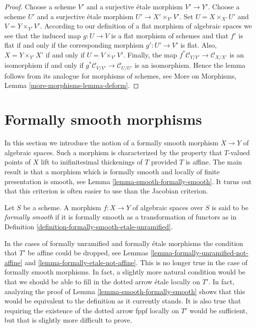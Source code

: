 \begin{proof}
Choose a scheme $V'$ and a surjective \'etale morphism $V' \to Y'$.
Choose a scheme $U'$ and a surjective \'etale morphism
$U' \to X' \times_{Y'} V'$. Set $U = X \times_{X'} U'$ and
$V = Y \times_{Y'} V'$. According to our definition of a flat morphism
of algebraic spaces we see that the induced map $g : U \to V$ is a flat
morphism of schemes and that $f'$ is flat if and only if the corresponding
morphism $g' : U' \to V'$ is flat. Also, $X = Y \times_{Y'} X'$ if and only
if $U = V \times_{V'} V'$. Finally, the map
$f^*\mathcal{C}_{Y/Y'} \to \mathcal{C}_{X/X'}$
is an isomorphism if and only if
$g^*\mathcal{C}_{V/V'} \to \mathcal{C}_{U/U'}$ is an isomorphism.
Hence the lemma follows from its analogue for morphisms of schemes, see
More on Morphisms, Lemma \ref{more-morphisms-lemma-deform}.
\end{proof}












\section{Formally smooth morphisms}
\label{section-formally-smooth}

\noindent
In this section we introduce the notion of a formally smooth morphism
$X \to Y$ of algebraic spaces. Such a morphism is
characterized by the property that $T$-valued points of $X$ lift
to inifinitesimal thickenings of $T$ provided $T$ is affine.
The main result is that a morphism which is formally smooth and
locally of finite presentation is smooth, see
Lemma \ref{lemma-smooth-formally-smooth}.
It turns out that this criterion is often easier to use than the
Jacobian criterion.

\begin{definition}
\label{definition-formally-smooth}
Let $S$ be a scheme. A morphism $f : X \to Y$ of algebraic spaces over $S$
is said to be {\it formally smooth} if it is formally smooth as a
transformation of functors as in
Definition \ref{definition-formally-smooth-etale-unramified}.
\end{definition}

\noindent
In the cases of formally unramified and formally \'etale morphisms
the condition that $T'$ be affine could be dropped, see
Lemmas \ref{lemma-formally-unramified-not-affine} and
\ref{lemma-formally-etale-not-affine}.
This is no longer true in the case of formally smooth morphisms.
In fact, a slightly more natural condition would be that we should be
able to fill in the dotted arrow \'etale locally on $T'$.
In fact, analyzing the proof of
Lemma \ref{lemma-smooth-formally-smooth}
shows that this would be equivalent to the definition as it currently
stands. It is also true that requiring the existence of the dotted
arrow fppf locally on $T'$ would be sufficient, but that is slightly
more difficult to prove.

